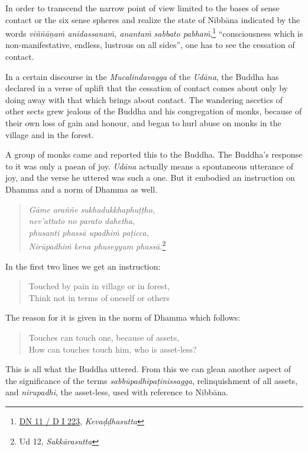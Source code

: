 In order to transcend the narrow point of view limited to the bases of sense contact or the six sense spheres and realize the state of Nibbāna indicated by the words \emph{viññāṇaṁ anidassanaṁ, anantaṁ sabbato pabhaṁ},\footnote{\href{https://suttacentral.net/dn11/pli/ms}{DN 11 / D I 223}, \emph{Kevaḍḍhasutta}} ``consciousness which is non-manifestative, endless, lustrous on all sides'', one has to see the cessation of contact.

In a certain discourse in the \emph{Mucalindavagga} of the \emph{Udāna}, the Buddha has declared in a verse of uplift that the cessation of contact comes about only by doing away with that which brings about contact. The wandering ascetics of other sects grew jealous of the Buddha and his congregation of monks, because of their own loss of gain and honour, and began to hurl abuse on monks in the village and in the forest.

A group of monks came and reported this to the Buddha. The Buddha's response to it was only a paean of joy. \emph{Udāna} actually means a spontaneous utterance of joy, and the verse he uttered was such a one. But it embodied an instruction on Dhamma and a norm of Dhamma as well.

\clearpage

\begin{quote}
\emph{Gāme araññe sukhadukkhaphuṭṭho,}\\
\emph{nev'attato no parato dahetha,}\\
\emph{phusanti phassā upadhiṁ paṭicca,}\\
\emph{Nirūpadhiṁ kena phuseyyum phassā.}\footnote{Ud 12, \emph{Sakkārasutta}}
\end{quote}

In the first two lines we get an instruction:

\begin{quote}
Touched by pain in village or in forest,\\
Think not in terms of oneself or others
\end{quote}

The reason for it is given in the norm of Dhamma which follows:

\begin{quote}
Touches can touch one, because of assets,\\
How can touches touch him, who is asset-less?
\end{quote}

This is all what the Buddha uttered. From this we can glean another aspect of the significance of the terms \emph{sabbūpadhipaṭinissagga}, relinquishment of all assets, and \emph{nirupadhi}, the asset-less, used with reference to Nibbāna.


